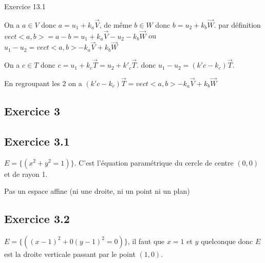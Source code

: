 \documentclass[]{book}
\theoremstyle{definition}
\begin{document}
Exercice 13.1

On a $a \in V$ donc $a = u_1 + k_a \overrightarrow{V}$, de m\^eme $b \in W$ donc $b = u_2 + k_b \overrightarrow{W}$. par d\'efinition $vect<a,b> = a - b = u_1 + k_a \overrightarrow{V} -u_2 - k_b \overrightarrow{W}$ ou $u_1 - u_2 = vect<a,b> - k_a \overrightarrow{V} + k_b \overrightarrow{W}$

On a $c \in T$ donc $c = u_1 + k_c \overrightarrow{T} = u_2 + k'_c \overrightarrow{T}$. donc $u_1-u_2 = (k'c-k_c) \overrightarrow{T}$.

En regroupant les 2 on a $(k'c-k_c) \overrightarrow{T} = vect<a,b> - k_a \overrightarrow{V} + k_b \overrightarrow{W}$

\subsection*{Exercice 3}
\subsection*{Exercice 3.1}
$E= \{ (x^2 + y^2 = 1)\}$. C'est l'\'equation param\'etrique du cercle de centre $(0,0)$ et de rayon 1.


Pas un espace affine (ni une droite, ni un point ni un plan)

\subsection*{Exercice 3.2}
$E= \{ ((x-1)^2 + 0(y-1)^2 = 0)\}$, il faut que $x=1$ et $y$ quelconque donc $E$ est la droite verticale passant par le point $(1,0)$.
\end{document}
